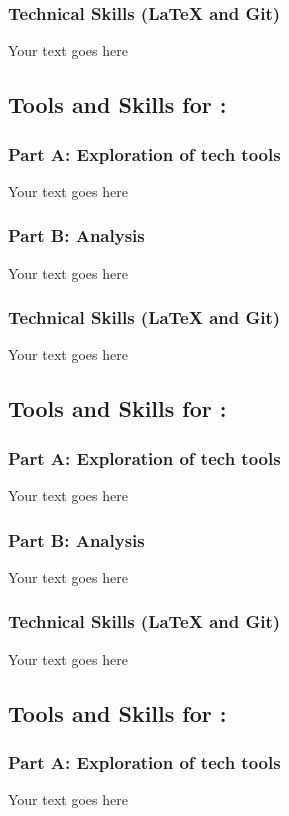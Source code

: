 \documentclass[a4paper, 11pt]{report}
\begin{document}
{\subsubsection{Technical Skills (LaTeX and Git)}
Your text goes here
\subsection{Tools and Skills for \majB: \studB}
\subsubsection{Part A: Exploration of tech tools}
Your text goes here
\subsubsection{Part B: Analysis}
Your text goes here
\subsubsection{Technical Skills (LaTeX and Git)}
Your text goes here
\subsection{Tools and Skills for \majC: \studC}
\subsubsection{Part A: Exploration of tech tools}
Your text goes here
\subsubsection{Part B: Analysis}
Your text goes here
\subsubsection{Technical Skills (LaTeX and Git)}
Your text goes here
\subsection{Tools and Skills for \majD: \studD}
\subsubsection{Part A: Exploration of tech tools}
Your text goes here
}
\end{document}
